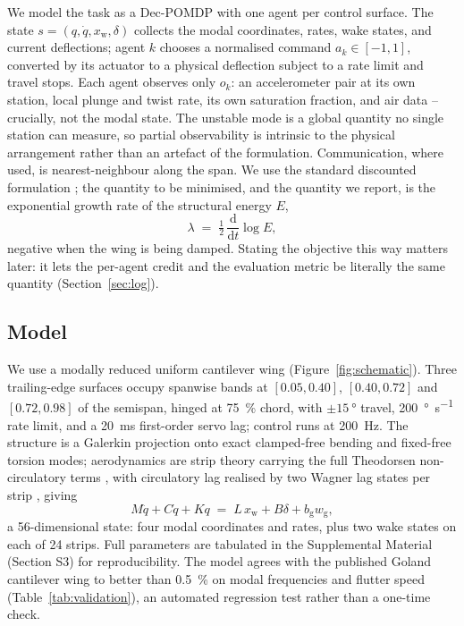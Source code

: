 \documentclass[journal]{new-aiaa}
\begin{document}
We model the task as a Dec-POMDP
\cite{bernstein2002complexity,oliehoek2016concise} with one agent per
control surface. The state $s=(q,\dot q,x_{\mathrm{w}},\delta)$ collects the
modal coordinates, rates, wake states, and current deflections; agent $k$
chooses a normalised command $a_k\in[-1,1]$, converted by its actuator to a
physical deflection subject to a rate limit and travel stops. Each agent
observes only $o_k$: an accelerometer pair at its own station, local plunge
and twist rate, its own saturation fraction, and air data -- crucially, not
the modal state. The unstable mode is a global quantity no single station
can measure, so partial observability is intrinsic to the physical
arrangement rather than an artefact of the formulation. Communication,
where used, is nearest-neighbour along the span. We use the standard
discounted formulation \cite{sutton2018reinforcement}; the quantity to be
minimised, and the quantity we report, is the exponential growth rate of
the structural energy $E$,
\begin{equation}
\lambda \;=\; \tfrac{1}{2}\,\frac{\mathrm{d}}{\mathrm{d}t}\log E ,
\label{eq:objective}
\end{equation}
negative when the wing is being damped. Stating the objective this way
matters later: it lets the per-agent credit and the evaluation metric be
literally the same quantity (Section~\ref{sec:log}).

\subsection{Model}
\label{sec:plant}

We use a modally reduced uniform cantilever wing (Figure~\ref{fig:schematic}).
Three trailing-edge surfaces occupy spanwise bands at
$[0.05,0.40]$, $[0.40,0.72]$ and $[0.72,0.98]$ of the semispan, hinged at
\SI{75}{\percent} chord, with $\pm\SI{15}{\degree}$ travel,
\SI{200}{\degree\per\second} rate limit, and a \SI{20}{\milli\second}
first-order servo lag; control runs at \SI{200}{\hertz}. The structure is a
Galerkin projection onto exact clamped-free bending and fixed-free torsion
modes; aerodynamics are strip theory carrying the full Theodorsen
non-circulatory terms \cite{theodorsen1935}, with circulatory lag realised
by two Wagner lag states per strip \cite{jones1940}, giving
\begin{equation}
M \ddot q + C \dot q + K q \;=\; L\, x_{\mathrm{w}} + B \delta
+ b_{\mathrm{g}} w_{\mathrm{g}} ,
\label{eq:eom}
\end{equation}
a 56-dimensional state: four modal coordinates and rates, plus two wake
states on each of 24 strips. Full parameters are tabulated in the
Supplemental Material (Section S3) for reproducibility. The model agrees
with the published Goland cantilever wing \cite{goland1945} to better than
\SI{0.5}{\percent} on modal frequencies and flutter speed
(Table~\ref{tab:validation}), an automated regression test rather than a
one-time check.
\end{document}
